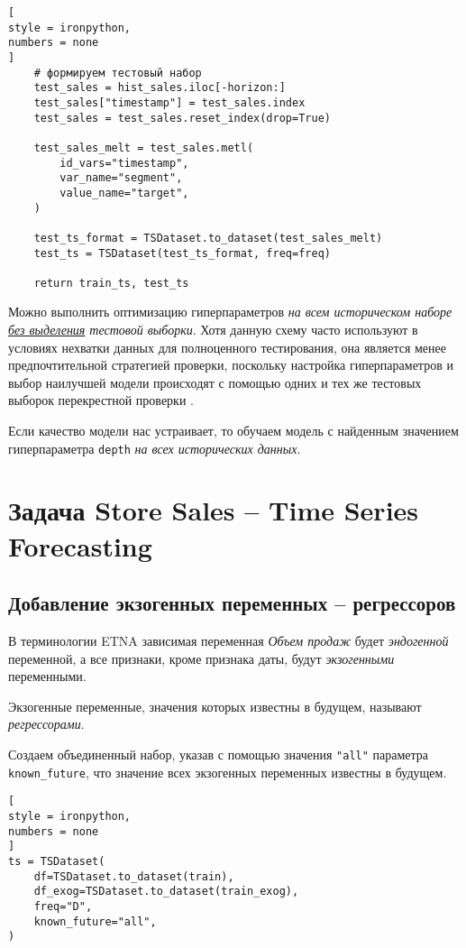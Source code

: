 \documentclass[%
	11pt,
	a4paper,
	utf8,
		]{article}
\begin{document}
\begin{lstlisting}[
style = ironpython,
numbers = none
]
    # формируем тестовый набор
    test_sales = hist_sales.iloc[-horizon:]
    test_sales["timestamp"] = test_sales.index
    test_sales = test_sales.reset_index(drop=True)
    
    test_sales_melt = test_sales.metl(
        id_vars="timestamp",
        var_name="segment",
        value_name="target",
    )
    
    test_ts_format = TSDataset.to_dataset(test_sales_melt)
    test_ts = TSDataset(test_ts_format, freq=freq)
    
    return train_ts, test_ts
\end{lstlisting}

Можно выполнить оптимизацию гиперпараметров \emph{на всем историческом наборе \underline{без выделения} тестовой выборки}. Хотя данную схему часто используют в условиях нехватки данных для полноценного тестирования, она является менее предпочтительной стратегией проверки, поскольку настройка гиперпараметров и выбор наилучшей модели происходят с помощью одних и тех же тестовых выборок перекрестной проверки \cite[]{gruzdev:time-series-2022}.

Если качество модели нас устраивает, то обучаем модель с найденным значением гиперпараметра \verb|depth| \emph{на всех исторических данных}.

\section{Задача Store Sales -- Time Series Forecasting}

\subsection{Добавление экзогенных переменных -- регрессоров}

В терминологии ETNA зависимая переменная \emph{Объем продаж} будет \emph{эндогенной} переменной, а все признаки, кроме признака даты, будут \emph{экзогенными} переменными.

Экзогенные переменные, значения которых известны в будущем, называют \emph{регрессорами}.

Создаем объединенный набор, указав с помощью значения \verb|"all"| параметра \verb|known_future|, что значение всех экзогенных переменных известны в будущем.
\begin{lstlisting}[
style = ironpython,
numbers = none
]
ts = TSDataset(
    df=TSDataset.to_dataset(train),
    df_exog=TSDataset.to_dataset(train_exog),
    freq="D",
    known_future="all",
)
\end{lstlisting}
\end{document}
